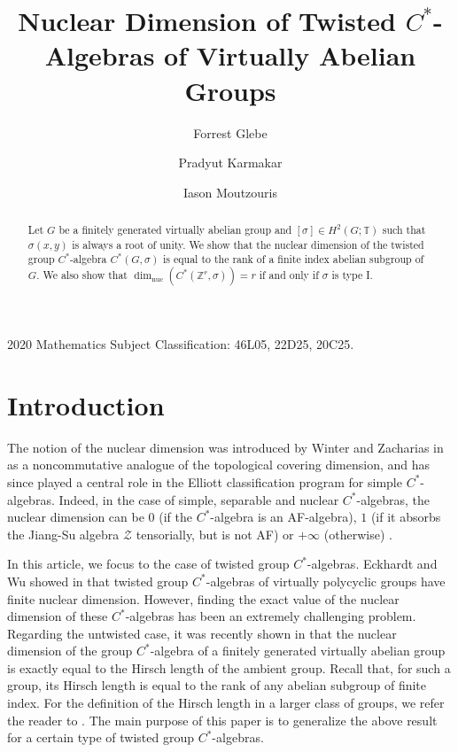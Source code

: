 \documentclass{amsart}
\title[Nuclear Dimension of Twisted Algebras of
Virtually Abelian Groups]{Nuclear Dimension of Twisted $C^*$-Algebras of
Virtually Abelian Groups}
\author{Forrest Glebe}
\author{Pradyut Karmakar}
\author{Iason Moutzouris}
\theoremstyle{definition}
\newcommand{\Z}{\mathbb{Z}}
\newcommand{\TT}{\mathbb{T}}
\newcommand{\ZZ}{\mathcal{Z}}
\DeclareMathOperator{\nuc}{nuc}
\newcommand{\dimnuc}{\dim_{\nuc}}
\begin{document}
\begin{abstract}
    Let $G$ be a finitely generated virtually abelian group and $[\sigma]\in H^2(G;\TT)$ such that $\sigma(x,y)$ is always a root of unity. We show that the nuclear dimension of the twisted group $C^{\ast}$-algebra $C^*(G,\sigma)$ is equal to the rank of a finite index abelian subgroup of $G$. We also show that $\dimnuc(C^*(\Z^r,\sigma))=r$ if and only if $\sigma$ is type I.
    
    
\end{abstract}
\maketitle
\begingroup
\renewcommand\thefootnote{}

2020 Mathematics Subject Classification: 46L05, 22D25, 20C25. \par
\endgroup
\section{Introduction}
The notion of the nuclear dimension was introduced by Winter and Zacharias in \cite{WZ10} as a noncommutative analogue of the topological covering dimension, and has since played a central role in the Elliott classification program for simple $C^*$-algebras. Indeed, in the case of simple, separable and nuclear $C^*$-algebras, the nuclear dimension can be $0$ (if the $C^*$-algebra is an AF-algebra), $1$ (if it absorbs the Jiang-Su algebra $\ZZ$ tensorially, but is not AF) or $+\infty$ (otherwise) \cite{dim_nuc_simple,dim_nuc_simple_st_proj}. \par
In this article, we focus to the case of twisted group $C^*$-algebras. Eckhardt and Wu showed in \cite{EcWu2026} that twisted group $C^*$-algebras of virtually polycyclic groups have finite nuclear dimension. However, finding the exact value of the nuclear dimension of these $C^*$-algebras has been an extremely challenging problem. Regarding the untwisted case, it was recently shown in \cite{paper_untwisted_case} that the nuclear dimension of the group $C^{\ast}$-algebra of a finitely generated virtually abelian group is exactly equal to the Hirsch length of the ambient group. Recall that, for such a group, its Hirsch length is equal to the rank of any abelian subgroup of finite index. For the definition of the Hirsch length in a larger class of groups, we refer the reader to \cite{hillman_finite_Hirsch_length_old}. The main purpose of this paper is to generalize the above result for a certain type of twisted group $C^*$-algebras.
\end{document}
